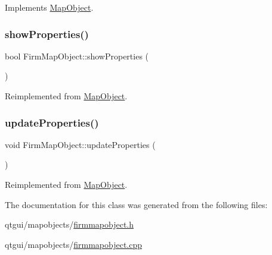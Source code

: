 Implements \mbox{\hyperlink{class_map_object_a82e055e41c862ec8d80d5bfb137b3253}{Map\+Object}}.

\mbox{\label{class_firm_map_object_a61a442f9a8afc283bdf659a63f092ff5}} 
\subsubsection{\texorpdfstring{showProperties()}{showProperties()}}
{\footnotesize\ttfamily bool Firm\+Map\+Object\+::show\+Properties (\begin{DoxyParamCaption}{ }\end{DoxyParamCaption})\hspace{0.3cm}{\ttfamily [virtual]}}



Reimplemented from \mbox{\hyperlink{class_map_object_ac58ccb02d5d96d934939b217020c822c}{Map\+Object}}.

\mbox{\label{class_firm_map_object_a565930e0db830d0f03a49f74f99eb61f}} 
\subsubsection{\texorpdfstring{updateProperties()}{updateProperties()}}
{\footnotesize\ttfamily void Firm\+Map\+Object\+::update\+Properties (\begin{DoxyParamCaption}{ }\end{DoxyParamCaption})\hspace{0.3cm}{\ttfamily [virtual]}}



Reimplemented from \mbox{\hyperlink{class_map_object_afa7cd6a4368f4dd077614ac1d983a6c8}{Map\+Object}}.



The documentation for this class was generated from the following files\+:\begin{DoxyCompactItemize}
\item 
qtgui/mapobjects/\mbox{\hyperlink{firmmapobject_8h}{firmmapobject.\+h}}\item 
qtgui/mapobjects/\mbox{\hyperlink{firmmapobject_8cpp}{firmmapobject.\+cpp}}\end{DoxyCompactItemize}
